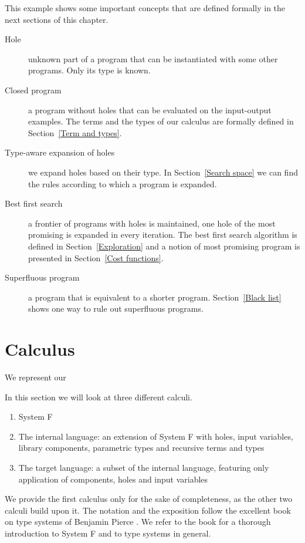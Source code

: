 This example shows some important concepts that are defined formally in the next sections of this chapter.
\begin{description}
\item[Hole] unknown part of a program that can be instantiated with some other programs. Only its type is known.
\item[Closed program] a program without holes that can be evaluated on the input-output examples. The terms and the types of our calculus are formally defined in Section~\ref{Term and types}.
\item[Type-aware expansion of holes] we expand holes based on their type. In Section~\ref{Search space} we can find the rules according to which a program is expanded.
\item[Best first search] a frontier of programs with holes is maintained, one hole of the most promising is expanded in every iteration. The best first search algorithm is defined in Section~\ref{Exploration} and a notion of most promising program is presented in Section~\ref{Cost functions}.
\item[Superfluous program] a program that is equivalent to a shorter program. Section~\ref{Black list} shows one way to rule out superfluous programs.
\end{description}
 
\section{Calculus}

We represent our

In this section we will look at three different calculi.
\begin{enumerate}[1.]
\item System F
\item The internal language: an extension of System F with holes, input variables, library components, parametric types and recursive terms and types
\item The target language: a subset of the internal language, featuring only application of components, holes and input variables
\end{enumerate}

We provide the first calculus only for the sake of completeness, as the other two calculi build upon it. The notation and the exposition follow the excellent book on type systems of Benjamin Pierce \cite{pierce2002types}. We refer to the book for a thorough introduction to System F and to type systems in general.

